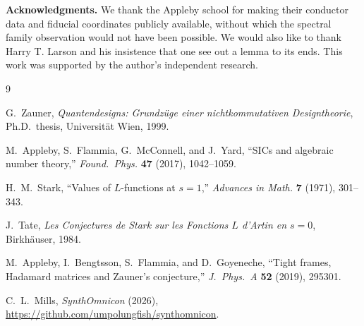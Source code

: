 \documentclass[12pt]{article}
\theoremstyle{plain}
\theoremstyle{definition}
\theoremstyle{remark}
\begin{document}
\vspace{1em}
\noindent\textbf{Acknowledgments.} We thank the Appleby school for making their conductor data and fiducial coordinates publicly available, without which the spectral family observation would not have been possible. We would also like to thank Harry T. Larson and his insistence that one see out a lemma to its ends. This work was supported by the author's independent research.

\begin{thebibliography}{9}

G.~Zauner, \emph{Quantendesigns: Grundz\"uge einer nichtkommutativen Designtheorie}, Ph.D.\ thesis, Universit\"at Wien, 1999.

M.~Appleby, S.~Flammia, G.~McConnell, and J.~Yard, ``SICs and algebraic number theory,'' \emph{Found.\ Phys.} \textbf{47} (2017), 1042--1059.

H.~M.~Stark, ``Values of $L$-functions at $s=1$,'' \emph{Advances in Math.} \textbf{7} (1971), 301--343.

J.~Tate, \emph{Les Conjectures de Stark sur les Fonctions $L$ d'Artin en $s=0$}, Birkh\"auser, 1984.

M.~Appleby, I.~Bengtsson, S.~Flammia, and D.~Goyeneche, ``Tight frames, Hadamard matrices and Zauner's conjecture,'' \emph{J.~Phys.~A} \textbf{52} (2019), 295301.

C.~L.~Mills, \emph{SynthOmnicon} (2026), \url{https://github.com/umpolungfish/synthomnicon}.

\end{thebibliography}
\end{document}
